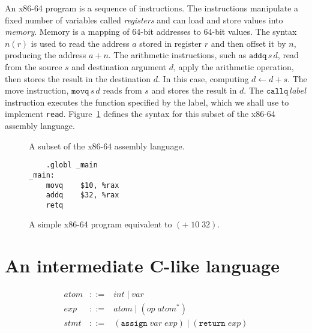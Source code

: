 \documentclass[10pt]{book}
\newcommand{\itm}[1]{\ensuremath{\mathit{#1}}}
\newcommand{\Atom}{\itm{atom}}
\newcommand{\Stmt}{\itm{stmt}}
\newcommand{\Exp}{\itm{exp}}
\newcommand{\Ins}{\itm{instr}}
\newcommand{\Prog}{\itm{prog}}
\newcommand{\Arg}{\itm{arg}}
\newcommand{\Int}{\itm{int}}
\newcommand{\Var}{\itm{var}}
\newcommand{\Op}{\itm{op}}
\newcommand{\key}[1]{\texttt{#1}}
\begin{document}
An x86-64 program is a sequence of instructions. The instructions
manipulate a fixed number of variables called \emph{registers} and can
load and store values into \emph{memory}. Memory is a mapping of
64-bit addresses to 64-bit values. The syntax $n(r)$ is used to read
the address $a$ stored in register $r$ and then offset it by $n$,
producing the address $a + n$. The arithmetic instructions, such as
$\key{addq}\,s\,d$, read from the source $s$ and destination argument
$d$, apply the arithmetic operation, then stores the result in the
destination $d$. In this case, computing $d \gets d + s$.  The move
instruction, $\key{movq}\,s\,d$ reads from $s$ and stores the result
in $d$. The $\key{callq}\,\mathit{label}$ instruction executes the
function specified by the label, which we shall use to implement
\key{read}. Figure~\ref{fig:x86-a} defines the syntax for this
subset of the x86-64 assembly language.

\begin{figure}[tbp]
\fbox{
\begin{minipage}{0.96\textwidth}
\[
\begin{array}{lcl}
\itm{register} &::=& \key{rax} \mid \key{rbx} \mid \key{rcx}
              \mid \key{rdx} \mid \key{rsi} \mid \key{rdi} \mid \\
              && \key{r8} \mid \key{r9} \mid \key{r10}
              \mid \key{r11} \mid \key{r12} \mid \key{r13}
              \mid \key{r14} \mid \key{r15} \\
\Arg &::=&  \Int \mid \key{\%}\itm{register} \mid \Int(\key{\%}\itm{register}) \\ 
\Ins &::=& \key{addq} \; \Arg \; \Arg \mid 
      \key{subq} \; \Arg \; \Arg \mid 
      \key{imulq} \; \Arg \; \Arg \mid 
      \key{negq} \; \Arg \mid \\
  && \key{movq} \; \Arg \; \Arg \mid 
      \key{callq} \; \mathit{label} \\
\Prog &::= & \Ins^{*}
\end{array}
\]
\end{minipage}
}
\caption{A subset of the x86-64 assembly language.}
\label{fig:x86-a}
\end{figure}

\begin{figure}[tbp]
\begin{lstlisting}
	.globl _main
_main:
	movq	$10, %rax
	addq	$32, %rax
	retq
\end{lstlisting}
\caption{A simple x86-64 program equivalent to $(+ \; 10 \; 32)$.}
\label{fig:p0-x86}
\end{figure}

\section{An intermediate C-like language}

\[
\begin{array}{lcl}
\Atom &::=& \Int \mid \Var \\
\Exp &::=& \Atom \mid (\Op \; \Atom^{*})\\
\Stmt &::=& (\key{assign} \; \Var \; \Exp) \mid (\key{return}\; \Exp)
\end{array}
\]




\end{document}
